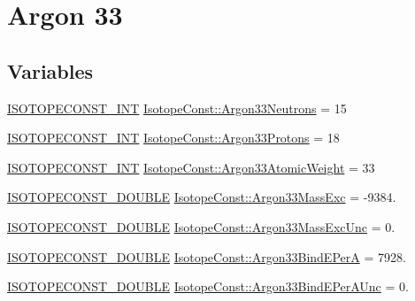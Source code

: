 \hypertarget{group___isotope_const-_argon-_ar33}{}\section{Argon 33}
\label{group___isotope_const-_argon-_ar33}
\subsection*{Variables}
\begin{DoxyCompactItemize}
\item 
\mbox{\hyperlink{group___isotope_const-_macros_ga5f18360b3e99483a35c32d789e62621c}{I\+S\+O\+T\+O\+P\+E\+C\+O\+N\+S\+T\+\_\+\+I\+NT}} \mbox{\hyperlink{group___isotope_const-_argon-_ar33_gafa90838cfb346f27cbba1aa11280362c}{Isotope\+Const\+::\+Argon33\+Neutrons}} = 15
\item 
\mbox{\hyperlink{group___isotope_const-_macros_ga5f18360b3e99483a35c32d789e62621c}{I\+S\+O\+T\+O\+P\+E\+C\+O\+N\+S\+T\+\_\+\+I\+NT}} \mbox{\hyperlink{group___isotope_const-_argon-_ar33_ga6caf2e641aa7110a4101a483b23ae301}{Isotope\+Const\+::\+Argon33\+Protons}} = 18
\item 
\mbox{\hyperlink{group___isotope_const-_macros_ga5f18360b3e99483a35c32d789e62621c}{I\+S\+O\+T\+O\+P\+E\+C\+O\+N\+S\+T\+\_\+\+I\+NT}} \mbox{\hyperlink{group___isotope_const-_argon-_ar33_ga8913b3c03a3ba9638c05959b92e856fd}{Isotope\+Const\+::\+Argon33\+Atomic\+Weight}} = 33
\item 
\mbox{\hyperlink{group___isotope_const-_macros_ga8f45a7272ce02c0b4c65c44636ed719a}{I\+S\+O\+T\+O\+P\+E\+C\+O\+N\+S\+T\+\_\+\+D\+O\+U\+B\+LE}} \mbox{\hyperlink{group___isotope_const-_argon-_ar33_ga68ee64029309897a7736ba54b5a2399d}{Isotope\+Const\+::\+Argon33\+Mass\+Exc}} = -\/9384.
\item 
\mbox{\hyperlink{group___isotope_const-_macros_ga8f45a7272ce02c0b4c65c44636ed719a}{I\+S\+O\+T\+O\+P\+E\+C\+O\+N\+S\+T\+\_\+\+D\+O\+U\+B\+LE}} \mbox{\hyperlink{group___isotope_const-_argon-_ar33_ga58bfece808c38acfa8dc6a66e4222e6e}{Isotope\+Const\+::\+Argon33\+Mass\+Exc\+Unc}} = 0.
\item 
\mbox{\hyperlink{group___isotope_const-_macros_ga8f45a7272ce02c0b4c65c44636ed719a}{I\+S\+O\+T\+O\+P\+E\+C\+O\+N\+S\+T\+\_\+\+D\+O\+U\+B\+LE}} \mbox{\hyperlink{group___isotope_const-_argon-_ar33_gae38b5c1e73fdc85c6ec3d6b80ed1d7ec}{Isotope\+Const\+::\+Argon33\+Bind\+E\+PerA}} = 7928.
\item 
\mbox{\hyperlink{group___isotope_const-_macros_ga8f45a7272ce02c0b4c65c44636ed719a}{I\+S\+O\+T\+O\+P\+E\+C\+O\+N\+S\+T\+\_\+\+D\+O\+U\+B\+LE}} \mbox{\hyperlink{group___isotope_const-_argon-_ar33_ga34458eea9ea0254758362f2f3e0dd5aa}{Isotope\+Const\+::\+Argon33\+Bind\+E\+Per\+A\+Unc}} = 0.

\end{DoxyCompactItemize}

